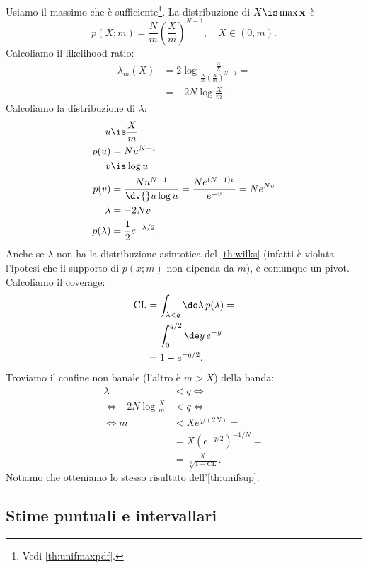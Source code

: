 \begin{solution}
	Usiamo il massimo che è sufficiente\footnote{Vedi \autoref{th:unifmaxpdf}.}.
	La distribuzione di $X\is\max\mathbf x$ è
	\begin{equation*}
		p(X;m)
		= \frac Nm \left(\frac Xm\right)^{N-1},
		\quad X \in (0,m).
	\end{equation*}
	Calcoliamo il likelihood ratio:
	\begin{align*}
		\lambda_m(X)
		&= 2\log\frac {\frac NX} {\frac Nm \left(\frac Xm\right)^{N-1}} = \\
		&= -2N\log\frac Xm.
	\end{align*}
	Calcoliamo la distribuzione di $\lambda$:
	\begin{align*}
		u
		&\is \frac Xm \\
		p(u)
		&= N u^{N-1} \\
		v
		&\is \log u \\
		p(v)
		&= \frac{Nu^{N-1}}{\dv{}u\log u}
		= \frac{Ne^{(N-1)v}}{e^{-v}}
		= N e^{Nv} \\
		\lambda
		&= -2Nv \\
		p(\lambda)
		&= \frac 12 e^{-\lambda/2}.
	\end{align*}
	Anche se $\lambda$ non ha la distribuzione asintotica del \autoref{th:wilks}
	(infatti è violata l'ipotesi che il supporto di $p(x;m)$ non dipenda da $m$),
	è comunque un pivot.
	Calcoliamo il coverage:
	\begin{align*}
		\mathrm{CL}
		&= \int_{\lambda<q} \de\lambda\, p(\lambda) = \\
		&= \int_0^{q/2} \de y\, e^{-y} = \\
		&= 1 - e^{-q/2}.
	\end{align*}
	Troviamo il confine non banale (l'altro è $m>X$) della banda:
	\begin{align*}
		\lambda
		&< q \iff \\
		\iff -2N\log\frac Xm
		&< q \iff \\
		\iff m
		&< Xe^{q/(2N)} = \\
		&= X\left(e^{-q/2}\right)^{-1/N} = \\
		&= \frac X {\sqrt[N]{1-\mathrm{CL}}}.
	\end{align*}
	Notiamo che otteniamo lo stesso risultato dell'\autoref{th:unifsup}.
\end{solution}

\subsection{Stime puntuali e intervallari}

